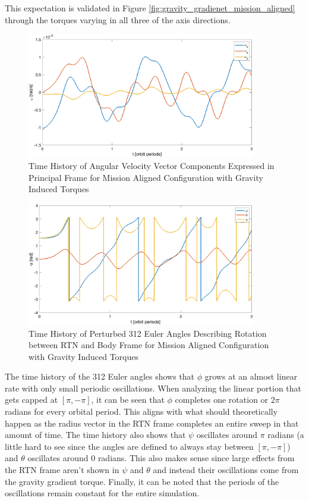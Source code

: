 This expectation is validated in Figure \ref{fig:gravity_gradienet_mission_aligned} through the torques varying in all three of the axis directions.

\begin{figure}[H]
    \centering
    \captionsetup{ justification = centering}
    \includegraphics[width = 10cm]{Images/PS4/angular_velocity_under_grav.png}
    \caption{Time History of Angular Velocity Vector Components Expressed in Principal Frame for Mission Aligned Configuration with Gravity Induced Torques}
    \label{fig:grav_mission_velocities}
\end{figure}


\begin{figure}[H]
    \centering
    \captionsetup{justification = centering}
    \includegraphics[width = 10cm]{Images/PS4/attitude_under_grav.png}
    \caption{Time History of Perturbed 312 Euler Angles Describing Rotation between RTN and Body Frame for Mission Aligned Configuration with Gravity Induced Torques}
    \label{fig:grav_mission_attitudes}
\end{figure}

The time history of the 312 Euler angles shows that $\phi$ grows at an almost linear rate with only small periodic oscillations. When analyzing the linear portion that gets capped at $[\pi, -\pi]$, it can be seen that  $\phi$ completes one rotation or $2\pi$ radians for every orbital period. This aligns with what should theoretically happen as the radius vector in the RTN frame completes an entire sweep in that amount of time. The time history also shows that $\psi$ oscillates around $\pi$ radians (a little hard to see since the angles are defined to always stay between $[\pi, -\pi]$) and $\theta$ oscillates around 0 radians. This also makes sense since large effects from the RTN frame aren't shown in $\psi$ and $\theta$ and instead their oscillations come from the gravity gradient torque. Finally, it can be noted that the periods of the oscillations remain constant for the entire simulation.
